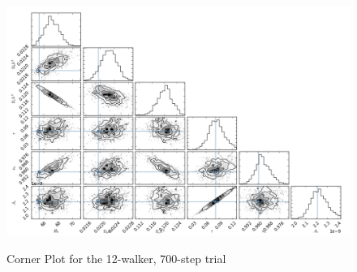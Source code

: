 \documentclass[aps,prd,final,twocolumn]{revtex4}
\begin{document}
\begin{figure}
\begin{center}
\includegraphics[scale=.4]{data_12_700.png}
\label{fig:f4}
\caption{Corner Plot for the 12-walker, 700-step trial}
\end{center}
\end{figure}
\end{document}
